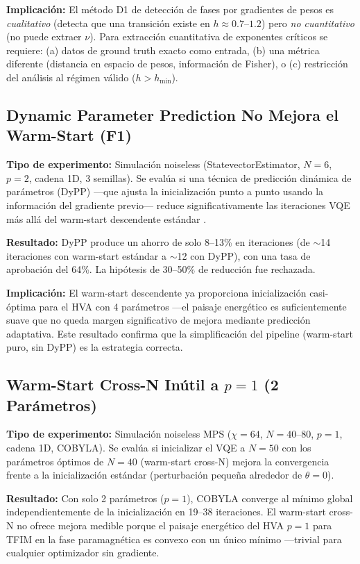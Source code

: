 \documentclass[11pt,a4paper,spanish]{book}
\begin{document}
\textbf{Implicación:} El método D1 de detección de fases por gradientes de pesos es \emph{cualitativo} (detecta que una transición existe en $h \approx 0.7$--$1.2$) pero \emph{no cuantitativo} (no puede extraer $\nu$). Para extracción cuantitativa de exponentes críticos se requiere: (a) datos de ground truth exacto como entrada, (b) una métrica diferente (distancia en espacio de pesos, información de Fisher), o (c) restricción del análisis al régimen válido ($h > h_{\min}$).

\subsection{Dynamic Parameter Prediction No Mejora el Warm-Start (F1)}

\textbf{Tipo de experimento:} Simulación noiseless (StatevectorEstimator, $N = 6$, $p = 2$, cadena 1D, 3 semillas). Se evalúa si una técnica de predicción dinámica de parámetros (DyPP) ---que ajusta la inicialización punto a punto usando la información del gradiente previo--- reduce significativamente las iteraciones VQE más allá del warm-start descendente estándar \citep{puig2025}.

\textbf{Resultado:} DyPP produce un ahorro de solo 8--13\% en iteraciones (de $\sim$14 iteraciones con warm-start estándar a $\sim$12 con DyPP), con una tasa de aprobación del 64\%. La hipótesis de 30--50\% de reducción fue rechazada.

\textbf{Implicación:} El warm-start descendente ya proporciona inicialización casi-óptima para el HVA con 4 parámetros ---el paisaje energético es suficientemente suave \citep{mele2022} que no queda margen significativo de mejora mediante predicción adaptativa. Este resultado confirma que la simplificación del pipeline (warm-start puro, sin DyPP) es la estrategia correcta.

\subsection{Warm-Start Cross-N Inútil a $p = 1$ (2 Parámetros)}

\textbf{Tipo de experimento:} Simulación noiseless MPS ($\chi = 64$, $N = 40$--$80$, $p = 1$, cadena 1D, COBYLA). Se evalúa si inicializar el VQE a $N = 50$ con los parámetros óptimos de $N = 40$ (warm-start cross-N) mejora la convergencia frente a la inicialización estándar (perturbación pequeña alrededor de $\theta = 0$).

\textbf{Resultado:} Con solo 2 parámetros ($p = 1$), COBYLA \citep{singh2025} converge al mínimo global independientemente de la inicialización en 19--38 iteraciones. El warm-start cross-N no ofrece mejora medible porque el paisaje energético del HVA $p = 1$ para TFIM en la fase paramagnética es convexo con un único mínimo ---trivial para cualquier optimizador sin gradiente.
\end{document}
